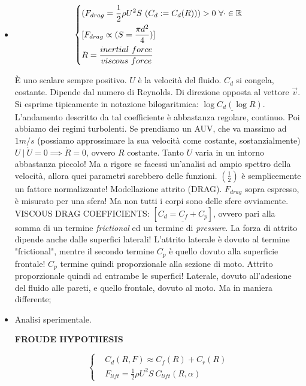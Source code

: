 \begin{itemize}

\item

\[
	\left\{
	\begin{aligned}
	&(F_{drag} = \frac{1}{2}\rho U^2 S\ (C_d:=C_d(R))) > 0\ \forall\mathord{\cdot} \in\R\\
	&[F_{drag} \propto (S = \frac{\pi d^2}{4})]\\
	&R = \frac{inertial\ force}{viscous\ force}
	\end{aligned}
	\right.
\]

\`E uno scalare sempre positivo. $U$ è la velocità del fluido. $C_d$ si congela, costante. Dipende dal numero di Reynolds. Di direzione opposta al vettore $\vec{v}$. Si esprime tipicamente in notazione bilogaritmica: $\underline{\log{C_d}(\log{R})}$. L'andamento descritto da tal coefficiente è abbastanza regolare, continuo. Poi abbiamo dei regimi turbolenti. Se prendiamo un AUV, che va massimo ad $1m/s$ (possiamo approssimare la sua velocità come costante, sostanzialmente) $U\ |\ \dot{U}=0 \implies \dot{R}=0$, ovvero $R$ costante. Tanto $U$ varia in un intorno abbastanza piccolo! Ma a rigore se facessi un'analisi ad ampio spettro della velocità, allora quei parametri sarebbero delle funzioni. $(\frac{1}{2})$ è semplicemente un fattore normalizzante! Modellazione attrito (DRAG). $F_{drag}$ sopra espresso, è misurato per una sfera! Ma non tutti i corpi sono delle sfere ovviamente. VISCOUS DRAG COEFFICIENTS: $[\underline{C_d = C_f + C_p}]$, ovvero pari alla somma di un termine \textit{frictional} ed un termine di \textit{pressure}. La forza di attrito dipende anche dalle superfici laterali! L'attrito laterale è dovuto al termine "frictional", mentre il secondo termine $C_p$ è quello dovuto alla superficie frontale! $C_p$ termine quindi proporzionale alla sezione di moto. Attrito proporzionale quindi ad entrambe le superfici! Laterale, dovuto all'adesione del fluido alle pareti, e quello frontale, dovuto al moto. Ma in maniera differente;

\item

Analisi sperimentale.

\begin{defn}{\textbf{FROUDE HYPOTHESIS}}

\[
	\left\{
	\begin{aligned}
	&C_d(R,F) \approx C_f(R) + C_r(R)\\
	&F_{lift} = \frac{1}{2}\rho U^2S\ C_{lift}(R,\alpha)
	\end{aligned}
	\right.
\]


\end{defn}
\end{itemize}
